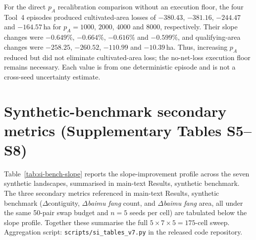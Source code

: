\documentclass[11pt]{article}
\begin{document}
\begin{table}[ht]
\centering
\scriptsize
\caption{Neijiang margin and area-penalty training ablations.}
\label{tab:si-neijiang-revision-ablations}
\end{table}

For the direct $p_A$ recalibration comparison without an execution floor, the four Tool~4 episodes produced cultivated-area losses of $-380.43$, $-381.16$, $-244.47$ and $-164.57$\,ha for $p_A=1000$, $2000$, $4000$ and $8000$, respectively. Their slope changes were $-0.649\%$, $-0.664\%$, $-0.616\%$ and $-0.599\%$, and qualifying-area changes were $-258.25$, $-260.52$, $-110.99$ and $-10.39$\,ha. Thus, increasing $p_A$ reduced but did not eliminate cultivated-area loss; the no-net-loss execution floor remains necessary. Each value is from one deterministic episode and is not a cross-seed uncertainty estimate.

\section{Synthetic-benchmark secondary metrics (Supplementary Tables S5--S8)}\label{si:s3-bench-secondary}

Table~\ref{tab:si-bench-slope} reports the slope-improvement profile across the seven synthetic landscapes, summarised in main-text Results, synthetic benchmark. The three secondary metrics referenced in main-text Results, synthetic benchmark ($\Delta$contiguity, $\Delta$\textit{baimu fang} count, and $\Delta$\textit{baimu fang} area, all under the same 50-pair swap budget and $n{=}5$ seeds per cell) are tabulated below the slope profile. Together these summarise the full $5 \times 7 \times 5 = 175$-cell sweep. Aggregation script: \texttt{scripts/si\_tables\_v7.py} in the released code repository.
\end{document}
